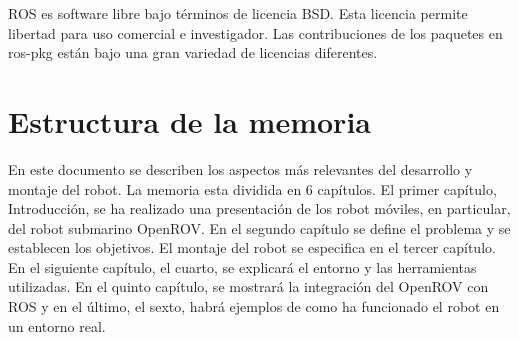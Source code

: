 ROS es software libre bajo términos de licencia BSD. Esta licencia permite libertad para uso comercial e investigador. Las contribuciones de los paquetes en ros-pkg están bajo una gran variedad de licencias diferentes.

\section{Estructura de la memoria}
\label{cap:estructuradelamemoria}
En este documento se describen los aspectos más relevantes del desarrollo y montaje del robot. La memoria esta dividida en 6 capítulos. 
El primer capítulo, Introducción, se ha realizado una presentación de los robot móviles, en particular, del robot submarino OpenROV. En el segundo capítulo se define el problema y se establecen los objetivos. El montaje del robot se especifica en el tercer capítulo. En el siguiente capítulo, el cuarto, se explicará el entorno y las herramientas utilizadas. En el quinto capítulo, se mostrará la integración del OpenROV con ROS y en el último, el sexto, habrá ejemplos de como ha funcionado el robot en un entorno real.
